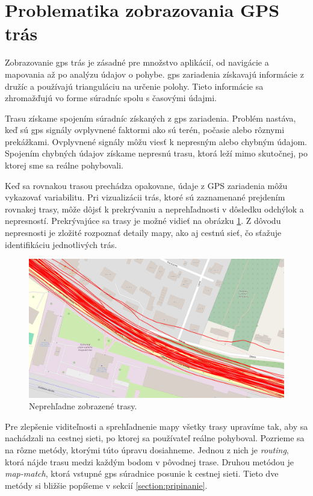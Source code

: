 \section{Problematika zobrazovania GPS trás}

\indent \indent Zobrazovanie \acrshort{gps} trás je zásadné pre množstvo aplikácií, od navigácie a mapovania až po analýzu údajov o pohybe. \acrshort{gps} zariadenia získavajú informácie z družíc a používajú trianguláciu na určenie polohy. Tieto informácie sa zhromažďujú vo forme súradníc spolu s časovými údajmi\cite{Hegarty2017}.

Trasu získame spojením súradníc získaných z \acrshort{gps} zariadenia. Problém nastáva, keď sú \acrshort{gps} signály ovplyvnené faktormi ako sú terén, počasie alebo rôznymi prekážkami. Ovplyvnené signály môžu viesť k nepresným alebo chybným údajom\cite{Hegarty2017}. Spojením chybných údajov získame nepresnú trasu, ktorá leží mimo skutočnej, po ktorej sme sa reálne pohybovali.

Keď sa rovnakou trasou prechádza opakovane, údaje z GPS zariadenia môžu vykazovať variabilitu. Pri vizualizácii trás, ktoré sú zaznamenané prejdením rovnakej trasy, môže dôjsť k prekrývaniu a neprehľadnosti v dôsledku odchýlok a nepresností. Prekrývajúce sa trasy je možné vidieť na obrázku \ref{fig:neprehladne-trasy}. Z dôvodu nepresnosti je zložité rozpoznať detaily mapy, ako aj cestnú sieť, čo sťažuje identifikáciu jednotlivých trás.

\begin{figure}[H]
  \centering
  \includegraphics[width=1 \textwidth]{img/problematika_gps/neprehladne_trasy.png}
  \caption{Neprehľadne zobrazené trasy.}
  \label{fig:neprehladne-trasy}
\end{figure}

Pre zlepšenie viditeľnosti a sprehľadnenie mapy všetky trasy upravíme tak, aby sa nachádzali na cestnej sieti, po ktorej sa používateľ reálne pohyboval. Pozrieme sa na rôzne metódy, ktorými túto úpravu dosiahneme. Jednou z nich je \textit{routing}, ktorá nájde trasu medzi každým bodom v pôvodnej trase. Druhou metódou je \textit{map-match}, ktorá vstupné \acrshort{gps} súradnice posunie k cestnej sieti. Tieto dve metódy si bližšie popíšeme v sekcií \ref{section:pripinanie}.

